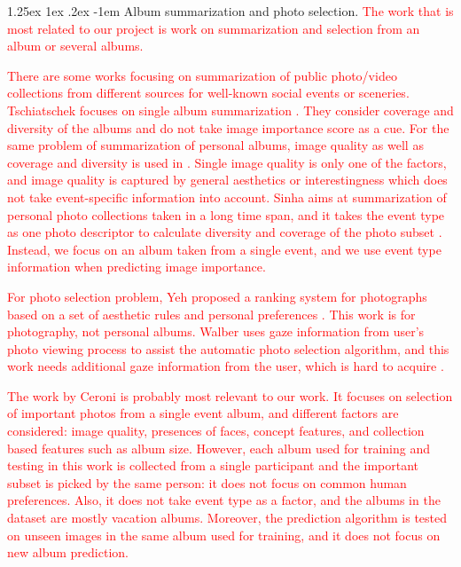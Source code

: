 \documentclass[10pt,twocolumn,letterpaper]{article}
\makeatletter
\renewcommand\paragraph{\@startsection{paragraph}{4}{\z@}%
           {1.25ex \@plus1ex \@minus.2ex}%
           {-1em}%
           {\normalfont\normalsize\bfseries}}
\makeatother
\begin{document}
\paragraph{Album summarization and photo selection.}
\textcolor{red}{The work that is most related to our project is work on summarization and selection from an album or several albums.}

\textcolor{red}{There are some works focusing on summarization of public photo/video collections from different sources for well-known social events or sceneries\cite{social_summarize, scene_summarize}. Tschiatschek \etal focuses on single album summarization \cite{nips_summarize}. They consider coverage and diversity of the albums and do not take image importance score as a cue. For the same problem of summarization of personal albums, image quality as well as coverage and diversity is used in \cite{vacation, sum_pinaki}. Single image quality is only one of the factors, and image quality is captured by general aesthetics or interestingness which does not take event-specific information into account. Sinha \etal aims at summarization of personal photo collections taken in a long time span, and it takes the event type as one photo descriptor to calculate diversity and coverage of the photo subset \cite{sum_pinaki}. Instead, we focus on an album taken from a single event, and we use event type information when predicting image importance.}

\textcolor{red}{For photo selection problem, Yeh \etal proposed a ranking system for photographs based on a set of aesthetic rules and personal preferences \cite{perosnalized_che} . This work is for photography, not personal albums.  Walber \etal uses gaze information from user's photo viewing process to assist the automatic photo selection algorithm, and this work needs additional gaze information from the user, which is hard to acquire \cite{gaze}.}

\textcolor{red}{The work by Ceroni \etal \cite{photo_selection1} is probably most relevant to our work. It focuses on selection of important photos from a single event album, and different factors are considered: image quality, presences of faces, concept features, and collection based features such as album size. However, each album used for training and testing in this work is collected from a single participant and the important subset is picked by the same person: it does not focus on common human preferences. Also, it does not take event type as a factor, and the albums in the dataset are mostly vacation albums. Moreover, the prediction algorithm is tested on unseen images in the same album used for training, and it does not focus on new album prediction. }
\end{document}
